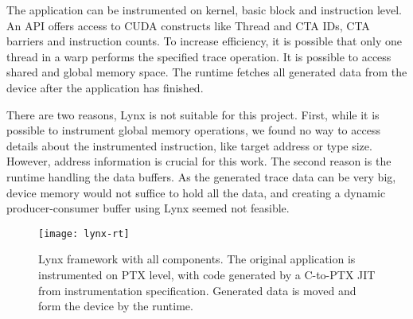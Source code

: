 The application can be instrumented on kernel, basic block and instruction level. An API offers access to CUDA constructs like Thread and CTA IDs, CTA barriers and instruction counts. To increase
efficiency, it is possible that only one thread in a warp performs the specified trace operation. It is possible to access shared and global memory space. The runtime fetches all generated data from the device after the application has finished.

There are two reasons, Lynx is not suitable for this project. First, while it is possible to instrument global memory operations, we found no way to access details about the instrumented instruction, like target address or type size. However, address information is crucial for this work. The second reason
is the runtime handling the data buffers. As the generated trace data can be very big, device memory would not suffice to hold all the data, and creating a dynamic producer-consumer buffer using Lynx seemed not feasible. 
\begin{figure}[t]
	\centering
	\texttt{[image: lynx-rt]}
	\caption{Lynx framework with all components. The original application is instrumented on PTX level, with code generated by a C-to-PTX JIT from instrumentation specification. Generated data is moved and form the device by the runtime.}
	\label{lynx-rt}
\end{figure}
